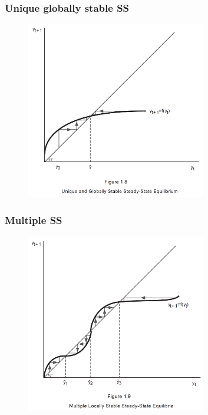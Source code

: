 \documentclass[11pt]{beamer}
\begin{document}

\begin{frame}
\frametitle{Unique globally stable SS}
{\begin{figure}
\centering
\includegraphics[width = 0.7\textwidth]{./images/fig6}
\end{figure}}
\end{frame}


\begin{frame}
\frametitle{Multiple SS}
{\begin{figure}
\centering
\includegraphics[width = 0.7\textwidth]{./images/fig7}
\end{figure}}
\end{frame}
\end{document}
